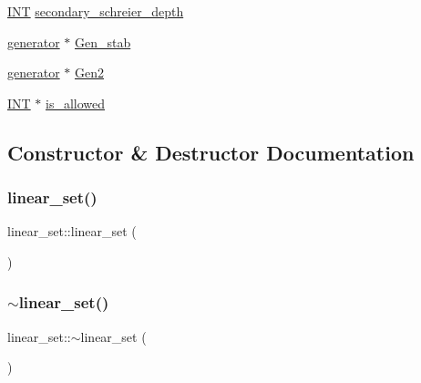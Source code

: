 \begin{DoxyCompactItemize}
\item 
\mbox{\hyperlink{galois_8h_a09fddde158a3a20bd2dcadb609de11dc}{I\+NT}} \mbox{\hyperlink{classlinear__set_a93e67b6ee05c08d849384725329fbaf1}{secondary\+\_\+schreier\+\_\+depth}}
\item 
\mbox{\hyperlink{classgenerator}{generator}} $\ast$ \mbox{\hyperlink{classlinear__set_a5e381d70ffb046533f16eca547a4ad47}{Gen\+\_\+stab}}
\item 
\mbox{\hyperlink{classgenerator}{generator}} $\ast$ \mbox{\hyperlink{classlinear__set_a59576bdbfcd381a2ab85b6a8d5447501}{Gen2}}
\item 
\mbox{\hyperlink{galois_8h_a09fddde158a3a20bd2dcadb609de11dc}{I\+NT}} $\ast$ \mbox{\hyperlink{classlinear__set_a6358d20d3285f2b01065e80fd41c6adb}{is\+\_\+allowed}}
\end{DoxyCompactItemize}


\subsection{Constructor \& Destructor Documentation}
\mbox{\label{classlinear__set_a7f49da8b10dd00d8397a2183f6e014f6}} 
\subsubsection{\texorpdfstring{linear\+\_\+set()}{linear\_set()}}
{\footnotesize\ttfamily linear\+\_\+set\+::linear\+\_\+set (\begin{DoxyParamCaption}{ }\end{DoxyParamCaption})}

\mbox{\label{classlinear__set_ac49533efb6f4087e4078f9de5aa2a637}} 
\subsubsection{\texorpdfstring{$\sim$linear\+\_\+set()}{~linear\_set()}}
{\footnotesize\ttfamily linear\+\_\+set\+::$\sim$linear\+\_\+set (\begin{DoxyParamCaption}{ }\end{DoxyParamCaption})}



